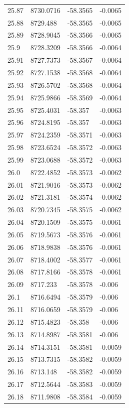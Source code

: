 \begin{table}[H]
\begin{tabular}{llll}
25.87 & 8730.0716 & -58.3565 & -0.0065 \\
25.88 & 8729.488 & -58.3565 & -0.0065 \\
25.89 & 8728.9045 & -58.3566 & -0.0065 \\
25.9 & 8728.3209 & -58.3566 & -0.0064 \\
25.91 & 8727.7373 & -58.3567 & -0.0064 \\
25.92 & 8727.1538 & -58.3568 & -0.0064 \\
25.93 & 8726.5702 & -58.3568 & -0.0064 \\
25.94 & 8725.9866 & -58.3569 & -0.0064 \\
25.95 & 8725.4031 & -58.357 & -0.0063 \\
25.96 & 8724.8195 & -58.357 & -0.0063 \\
25.97 & 8724.2359 & -58.3571 & -0.0063 \\
25.98 & 8723.6524 & -58.3572 & -0.0063 \\
25.99 & 8723.0688 & -58.3572 & -0.0063 \\
26.0 & 8722.4852 & -58.3573 & -0.0062 \\
26.01 & 8721.9016 & -58.3573 & -0.0062 \\
26.02 & 8721.3181 & -58.3574 & -0.0062 \\
26.03 & 8720.7345 & -58.3575 & -0.0062 \\
26.04 & 8720.1509 & -58.3575 & -0.0061 \\
26.05 & 8719.5673 & -58.3576 & -0.0061 \\
26.06 & 8718.9838 & -58.3576 & -0.0061 \\
26.07 & 8718.4002 & -58.3577 & -0.0061 \\
26.08 & 8717.8166 & -58.3578 & -0.0061 \\
26.09 & 8717.233 & -58.3578 & -0.006 \\
26.1 & 8716.6494 & -58.3579 & -0.006 \\
26.11 & 8716.0659 & -58.3579 & -0.006 \\
26.12 & 8715.4823 & -58.358 & -0.006 \\
26.13 & 8714.8987 & -58.3581 & -0.006 \\
26.14 & 8714.3151 & -58.3581 & -0.0059 \\
26.15 & 8713.7315 & -58.3582 & -0.0059 \\
26.16 & 8713.148 & -58.3582 & -0.0059 \\
26.17 & 8712.5644 & -58.3583 & -0.0059 \\
26.18 & 8711.9808 & -58.3584 & -0.0059 \\

\end{tabular}
\end{table}
